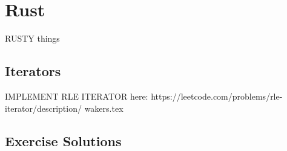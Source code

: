 
\chapter{Rust}

RUSTY things


\section{Iterators}

IMPLEMENT RLE ITERATOR here: https://leetcode.com/problems/rle-iterator/description/
{wakers.tex}

\section{Exercise Solutions}
\shipoutAnswer
